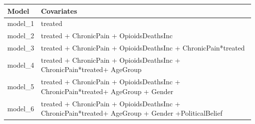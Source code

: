 \documentclass[
]{article}
\begin{document}
\begin{longtable}[]{@{}ll@{}}
\toprule
\begin{minipage}[b]{0.35\columnwidth}\raggedright
Model\strut
\end{minipage} & \begin{minipage}[b]{0.59\columnwidth}\raggedright
Covariates\strut
\end{minipage}\tabularnewline
\midrule
\endhead
\begin{minipage}[t]{0.35\columnwidth}\raggedright
model\_1\strut
\end{minipage} & \begin{minipage}[t]{0.59\columnwidth}\raggedright
treated\strut
\end{minipage}\tabularnewline
\begin{minipage}[t]{0.35\columnwidth}\raggedright
model\_2\strut
\end{minipage} & \begin{minipage}[t]{0.59\columnwidth}\raggedright
treated + ChronicPain + OpioidsDeathsInc\strut
\end{minipage}\tabularnewline
\begin{minipage}[t]{0.35\columnwidth}\raggedright
model\_3\strut
\end{minipage} & \begin{minipage}[t]{0.59\columnwidth}\raggedright
treated + ChronicPain + OpioidsDeathsInc + ChronicPain*treated\strut
\end{minipage}\tabularnewline
\begin{minipage}[t]{0.35\columnwidth}\raggedright
model\_4\strut
\end{minipage} & \begin{minipage}[t]{0.59\columnwidth}\raggedright
treated + ChronicPain + OpioidsDeathsInc + ChronicPain*treated+
AgeGroup\strut
\end{minipage}\tabularnewline
\begin{minipage}[t]{0.35\columnwidth}\raggedright
model\_5\strut
\end{minipage} & \begin{minipage}[t]{0.59\columnwidth}\raggedright
treated + ChronicPain + OpioidsDeathsInc + ChronicPain*treated+ AgeGroup
+ Gender\strut
\end{minipage}\tabularnewline
\begin{minipage}[t]{0.35\columnwidth}\raggedright
model\_6\strut
\end{minipage} & \begin{minipage}[t]{0.59\columnwidth}\raggedright
treated + ChronicPain + OpioidsDeathsInc + ChronicPain*treated+ AgeGroup
+ Gender +PoliticalBelief\strut
\end{minipage}\tabularnewline
\bottomrule
\end{longtable}
\end{document}
